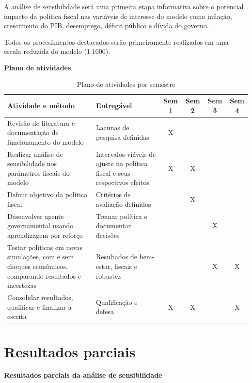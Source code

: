 \documentclass[12pt,a4paper]{article}
\begin{document}
A análise de sensibilidade será uma primeira etapa informativa sobre o potencial impacto da política fiscal nas variáveis de interesse do modelo como inflação, crescimento do PIB, desemprego, déficit público e dívida do governo.

Todos os procedimentos destacados serão primeiramente realizados em uma escala reduzida do modelo (1:1000).

\textbf{Plano de atividades} 

\begin{table}[H]
\centering
\caption{Plano de atividades por semestre}
\label{tab:plano-atividades}
\footnotesize
\setlength{\tabcolsep}{3pt}
\renewcommand{\arraystretch}{1.15}
\begin{tabularx}{\textwidth}{@{}>{\raggedright\arraybackslash}X >{\raggedright\arraybackslash}p{} cccc@{}}
\toprule
\textbf{Atividade e método} & \textbf{Entregável} & \textbf{Sem 1} & \textbf{Sem 2} & \textbf{Sem 3} & \textbf{Sem 4} \\
\midrule
Revisão de literatura e documentação de funcionamento do modelo
& Lacunas de pesquisa definidas & X & & & \\
\addlinespace[2pt]
Realizar análise de sensibilidade nos parâmetros fiscais do modelo
& Intervalos viáveis de ajuste na política fiscal e seus respectivos efeitos & X & X & & \\
\addlinespace[2pt]
Definir objetivo da política fiscal
& Critérios de avaliação definidos & & X & & \\
\addlinespace[2pt]
Desenvolver agente governamental usando aprendizagem por reforço
& Treinar política e documentar decisões & & & X & \\
\addlinespace[2pt]
Testar políticas em novas simulações, com e sem choques econômicos, comparando resultados e incertezas
& Resultados de bem-estar, fiscais e robustez & & & X & X \\
\addlinespace[2pt]
Consolidar resultados, qualificar e finalizar a escrita
& Qualificação e defesa & X & X & & X \\
\bottomrule
\end{tabularx}
\end{table}

\section{Resultados parciais}

\textbf{Resultados parciais da análise de sensibilidade}
\end{document}

